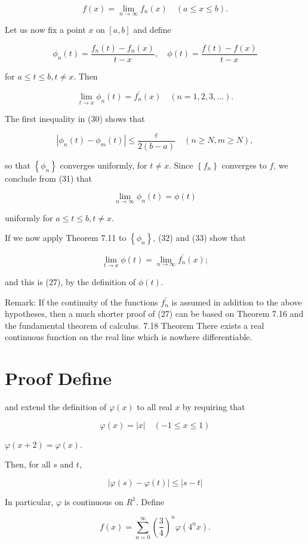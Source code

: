 \documentclass[10pt]{article}
\begin{document}
$$
f(x)=\lim _{n \rightarrow \infty} f_{n}(x) \quad(a \leq x \leq b) .
$$

Let us now fix a point $x$ on $[a, b]$ and define

$$
\phi_{n}(t)=\frac{f_{n}(t)-f_{n}(x)}{t-x}, \quad \phi(t)=\frac{f(t)-f(x)}{t-x}
$$

for $a \leq t \leq b, t \neq x$. Then

$$
\lim _{t \rightarrow x} \phi_{n}(t)=f_{n}^{\prime}(x) \quad(n=1,2,3, \ldots) .
$$

The first inequality in (30) shows that

$$
\left|\phi_{n}(t)-\phi_{m}(t)\right| \leq \frac{\varepsilon}{2(b-a)} \quad(n \geq N, m \geq N),
$$

so that $\left\{\phi_{n}\right\}$ converges uniformly, for $t \neq x$. Since $\left\{f_{n}\right\}$ converges to $f$, we conclude from (31) that

$$
\lim _{n \rightarrow \infty} \phi_{n}(t)=\phi(t)
$$

uniformly for $a \leq t \leq b, t \neq x$.

If we now apply Theorem 7.11 to $\left\{\phi_{n}\right\}$, (32) and (33) show that

$$
\lim _{t \rightarrow x} \phi(t)=\lim _{n \rightarrow \infty} f_{n}^{\prime}(x) ;
$$

and this is (27), by the definition of $\phi(t)$.

Remark: If the continuity of the functions $f_{n}^{\prime}$ is assumed in addition to the above hypotheses, then a much shorter proof of (27) can be based on Theorem 7.16 and the fundamental theorem of calculus. 7.18 Theorem There exists a real continuous function on the real line which is nowhere differentiable.

\section{Proof Define}
and extend the definition of $\varphi(x)$ to all real $x$ by requiring that

$$
\varphi(x)=|x| \quad(-1 \leq x \leq 1)
$$

$\varphi(x+2)=\varphi(x)$.

Then, for all $s$ and $t$,

$$
|\varphi(s)-\varphi(t)| \leq|s-t|
$$

In particular, $\varphi$ is continuous on $R^{1}$. Define

$$
f(x)=\sum_{n=0}^{\infty}\left(\frac{3}{4}\right)^{n} \varphi\left(4^{n} x\right) .
$$
\end{document}
